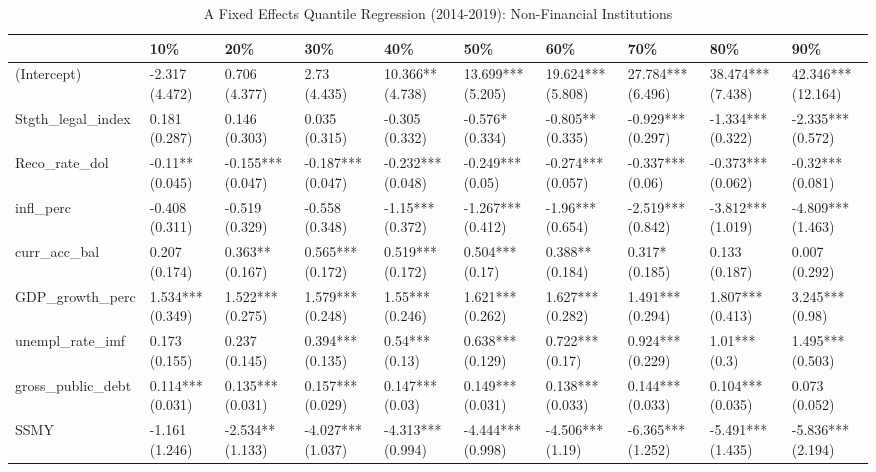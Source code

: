 \begin{table}[ht]
\centering
\caption{A Fixed Effects Quantile Regression (2014-2019): Non-Financial Institutions} 
\begingroup\small
\begin{tabular}{llllllllll}
  \toprule
 & 10\% & 20\% & 30\% & 40\% & 50\% & 60\% & 70\% & 80\% & 90\% \\ 
  \midrule
(Intercept) & -2.317 (4.472) & 0.706 (4.377) & 2.73 (4.435) & 10.366** (4.738) & 13.699*** (5.205) & 19.624*** (5.808) & 27.784*** (6.496) & 38.474*** (7.438) & 42.346*** (12.164) \\ 
  Stgth\_legal\_index & 0.181 (0.287) & 0.146 (0.303) & 0.035 (0.315) & -0.305 (0.332) & -0.576* (0.334) & -0.805** (0.335) & -0.929*** (0.297) & -1.334*** (0.322) & -2.335*** (0.572) \\ 
  Reco\_rate\_dol & -0.11** (0.045) & -0.155*** (0.047) & -0.187*** (0.047) & -0.232*** (0.048) & -0.249*** (0.05) & -0.274*** (0.057) & -0.337*** (0.06) & -0.373*** (0.062) & -0.32*** (0.081) \\ 
  infl\_perc & -0.408 (0.311) & -0.519 (0.329) & -0.558 (0.348) & -1.15*** (0.372) & -1.267*** (0.412) & -1.96*** (0.654) & -2.519*** (0.842) & -3.812*** (1.019) & -4.809*** (1.463) \\ 
  curr\_acc\_bal & 0.207 (0.174) & 0.363** (0.167) & 0.565*** (0.172) & 0.519*** (0.172) & 0.504*** (0.17) & 0.388** (0.184) & 0.317* (0.185) & 0.133 (0.187) & 0.007 (0.292) \\ 
  GDP\_growth\_perc & 1.534*** (0.349) & 1.522*** (0.275) & 1.579*** (0.248) & 1.55*** (0.246) & 1.621*** (0.262) & 1.627*** (0.282) & 1.491*** (0.294) & 1.807*** (0.413) & 3.245*** (0.98) \\ 
  unempl\_rate\_imf & 0.173 (0.155) & 0.237 (0.145) & 0.394*** (0.135) & 0.54*** (0.13) & 0.638*** (0.129) & 0.722*** (0.17) & 0.924*** (0.229) & 1.01*** (0.3) & 1.495*** (0.503) \\ 
  gross\_public\_debt & 0.114*** (0.031) & 0.135*** (0.031) & 0.157*** (0.029) & 0.147*** (0.03) & 0.149*** (0.031) & 0.138*** (0.033) & 0.144*** (0.033) & 0.104*** (0.035) & 0.073 (0.052) \\ 
  SSMY & -1.161 (1.246) & -2.534** (1.133) & -4.027*** (1.037) & -4.313*** (0.994) & -4.444*** (0.998) & -4.506*** (1.19) & -6.365*** (1.252) & -5.491*** (1.435) & -5.836*** (2.194) \\ 
   \bottomrule
\end{tabular}
\endgroup
\end{table}
